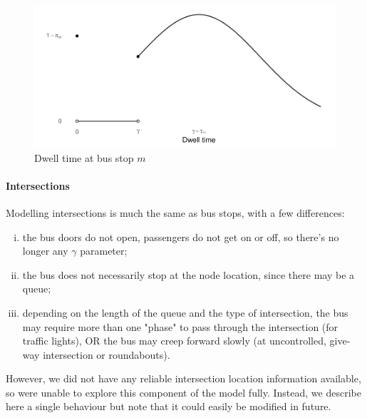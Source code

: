 \begin{knitrout}
\color{fgcolor}\begin{figure}
\includegraphics[width=\maxwidth]{figure/eta_dwell_times-1} \caption[Dwell time at bus stop $m$]{Dwell time at bus stop $m$}\label{fig:eta_dwell_times}
\end{figure}


\end{knitrout}



\paragraph{Intersections}

Modelling intersections is much the same as bus stops, with a few differences:
\begin{enumerate}[i.]
\item the bus doors do not open, passengers do not get on or off, so there's no longer any $\gamma$ parameter;
\item the bus does not necessarily stop at the node location, since there may be a queue;
\item depending on the length of the queue and the type of intersection, the bus may require more than one "phase" to pass through the intersection (for traffic lights), OR the bus may creep forward slowly (at uncontrolled, give-way intersection or roundabouts).
\end{enumerate}

However, we did not have any reliable intersection location information available, so were unable to explore this component of the model fully. Instead, we describe here a single behaviour but note that it could easily be modified in future.

